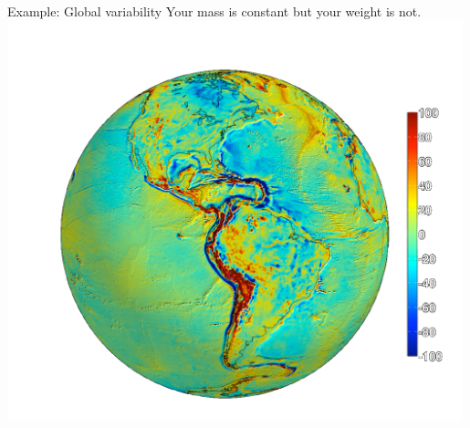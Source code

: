 \begin{frame}
    \begin{PointSix}{Example: Global variability}
    \centering
    \small Your mass is constant but your weight is not.
    \includegraphics[width=0.99\textwidth]{Figures/Gravity/Exported/Grace_JPLCaltect_FODT10_WithPeople.png}
    \end{PointSix}
\end{frame}
    

